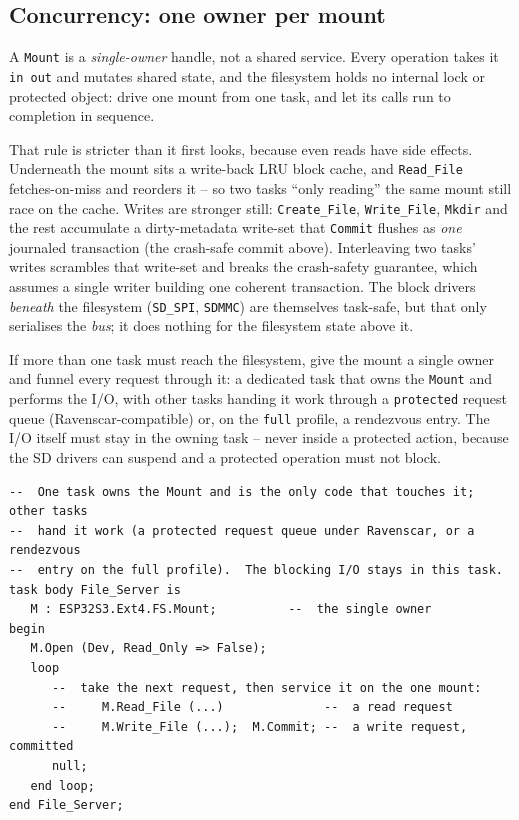 \subsection{Concurrency: one owner per mount}

A \texttt{Mount} is a \emph{single-owner} handle, not a shared service. Every
operation takes it \texttt{in out} and mutates shared state, and the filesystem
holds no internal lock or protected object: drive one mount from one task, and let
its calls run to completion in sequence.

That rule is stricter than it first looks, because even reads have side effects.
Underneath the mount sits a write-back LRU block cache, and \texttt{Read\_File}
fetches-on-miss and reorders it -- so two tasks ``only reading'' the same mount
still race on the cache. Writes are stronger still: \texttt{Create\_File},
\texttt{Write\_File}, \texttt{Mkdir} and the rest accumulate a dirty-metadata
write-set that \texttt{Commit} flushes as \emph{one} journaled transaction (the
crash-safe commit above). Interleaving two tasks' writes scrambles that write-set
and breaks the crash-safety guarantee, which assumes a single writer building one
coherent transaction. The block drivers \emph{beneath} the filesystem
(\texttt{SD\_SPI}, \texttt{SDMMC}) are themselves task-safe, but that only
serialises the \emph{bus}; it does nothing for the filesystem state above it.

If more than one task must reach the filesystem, give the mount a single owner and
funnel every request through it: a dedicated task that owns the \texttt{Mount} and
performs the I/O, with other tasks handing it work through a \texttt{protected}
request queue (Ravenscar-compatible) or, on the \texttt{full} profile, a rendezvous
entry. The I/O itself must stay in the owning task -- never inside a protected
action, because the SD drivers can suspend and a protected operation must not block.

\begin{lstlisting}
--  One task owns the Mount and is the only code that touches it; other tasks
--  hand it work (a protected request queue under Ravenscar, or a rendezvous
--  entry on the full profile).  The blocking I/O stays in this task.
task body File_Server is
   M : ESP32S3.Ext4.FS.Mount;          --  the single owner
begin
   M.Open (Dev, Read_Only => False);
   loop
      --  take the next request, then service it on the one mount:
      --     M.Read_File (...)              --  a read request
      --     M.Write_File (...);  M.Commit; --  a write request, committed
      null;
   end loop;
end File_Server;
\end{lstlisting}

